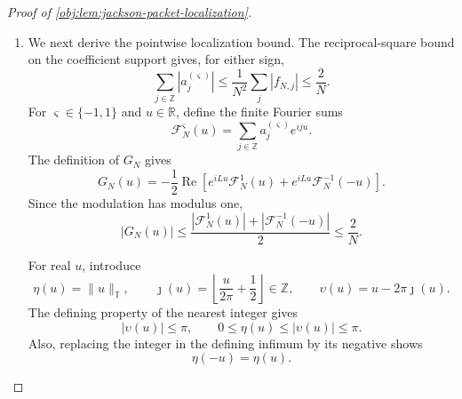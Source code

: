 \begin{proof}[Proof of \cref{obj:lem:jackson-packet-localization}]
\begin{enumerate}
The forward-difference product identity is
\[
\begin{aligned}
(\delta^2a^{(\varsigma)})_j
={}&f_{N,j+2}(\delta^2\rho^{\varsigma})_j\\
&+\{(\delta f_N)_{j+1}+(\delta f_N)_j\}
                  (\delta\rho^{\varsigma})_j
+\rho_{j+1}^{\varsigma}(\delta^2f_N)_j.
\end{aligned}
\]
For \(|j|\leq2N\), the preceding estimates imply
\[
\begin{aligned}
|(\delta^2a^{(\varsigma)})_j|
\leq{}&
\frac{64}{N^4}|f_{N,j+2}|
+\frac{16}{N^3}|(\delta f_N)_{j+1}|\\
&+\frac{16}{N^3}|(\delta f_N)_j|
+\frac1{N^2}|(\delta^2f_N)_j|.
\end{aligned}
\]
For \(|j|>2N\), all three values \(f_{N,j}\), \(f_{N,j+1}\), and
\(f_{N,j+2}\) vanish, so this inequality also holds there. In particular,
\(\delta^2a^{(\varsigma)}\) has finite support. Summing and using invariance of full-line sums under integer shifts gives
\[
\begin{aligned}
\sum_j|(\delta^2a^{(\varsigma)})_j|
&\leq
\frac{64}{N^4}\sum_j|f_{N,j}|
+\frac{32}{N^3}\sum_j|(\delta f_N)_j|
+\frac1{N^2}\sum_j|(\delta^2f_N)_j|\\
&\leq\frac{262}{N^3}
\leq\frac{512}{N^3}.
\end{aligned}
\]

\item We next derive the pointwise localization bound. The reciprocal-square bound on the coefficient support gives, for either sign,
\[
\sum_{j\in\mathbb Z}|a_j^{(\varsigma)}|
\leq\frac1{N^2}\sum_j|f_{N,j}|
\leq\frac2N.
\]
For \(\varsigma\in\{-1,1\}\) and \(u\in\mathbb R\), define the finite Fourier sums
\[
\mathcal F_N^{\varsigma}(u)
=\sum_{j\in\mathbb Z}a_j^{(\varsigma)}e^{iju}.
\]
The definition of \(G_N\) gives
\[
G_N(u)
=-\frac12\operatorname{Re}
\left[
e^{iLu}\mathcal F_N^1(u)
+e^{iLu}\mathcal F_N^{-1}(-u)
\right].
\]
Since the modulation has modulus one,
\[
|G_N(u)|
\leq
\frac{|\mathcal F_N^1(u)|+|\mathcal F_N^{-1}(-u)|}{2}
\leq\frac2N.
\]

For real \(u\), introduce
\[
\eta(u)=\|u\|_{\mathbb T},\qquad
\jmath(u)=\left\lfloor\frac{u}{2\pi}+\frac12\right\rfloor\in\mathbb Z,
\qquad
\upsilon(u)=u-2\pi\jmath(u).
\]
The defining property of the nearest integer gives
\[
|\upsilon(u)|\leq\pi,
\qquad
0\leq\eta(u)\leq|\upsilon(u)|\leq\pi.
\]
Also, replacing the integer in the defining infimum by its negative shows
\[
\eta(-u)=\eta(u).
\]


\end{enumerate}
\end{proof}

